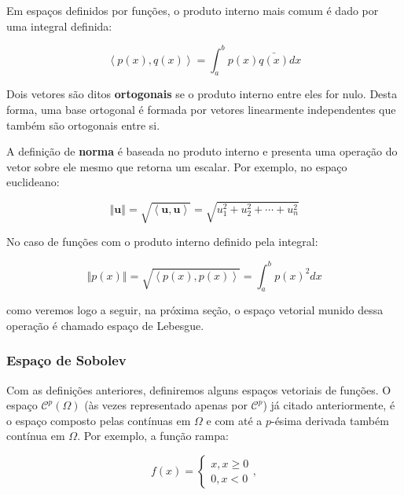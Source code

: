     Em espaços definidos por funções, o produto interno mais comum é dado por uma integral definida:

    \begin{equation}
        \left\langle p(x), q(x) \right\rangle  = \int_{a}^{b} p(x) \bar{q(x)} dx
    \end{equation}

    Dois vetores são ditos \textbf{ortogonais} se o produto interno entre eles for nulo. Desta forma, uma base ortogonal é formada por vetores linearmente independentes que também são ortogonais entre si.

    A definição de \textbf{norma} é baseada no produto interno e presenta uma operação do vetor sobre ele mesmo que retorna um escalar. Por exemplo, no espaço euclideano:

    \begin{equation}
        \left\Vert \mathbf{u} \right\Vert = \sqrt{\left\langle \mathbf{u},\mathbf{u} \right\rangle} = \sqrt{ u_1^2 + u_2^2 + \cdots + u_n^2}
    \end{equation}

    No caso de funções com o produto interno definido pela integral:

    \begin{equation}
        \left\Vert p(x) \right\Vert = \sqrt{\left\langle p(x),p(x) \right\rangle} = \int_{a}^{b} p(x)^2 dx
    \end{equation}

    \noindent como veremos logo a seguir, na próxima seção, o espaço vetorial munido dessa operação é chamado espaço de Lebesgue.

    \subsubsection*{Espaço de Sobolev}

    Com as definições anteriores, definiremos alguns espaços vetoriais de funções. O espaço $\mathcal{C}^p (\Omega)$ (às vezes representado apenas por $\mathcal{C}^p$) já citado anteriormente, é o espaço composto pelas contínuas em $\Omega$ e com até a $p$-ésima derivada também contínua em $\Omega$. Por exemplo, a função rampa:

        \begin{equation*}
            f(x) = \left\{\begin{array}{l}
                x, x \geq 0\\
                0, x<0
            \end{array}\right.,
        \end{equation*}

